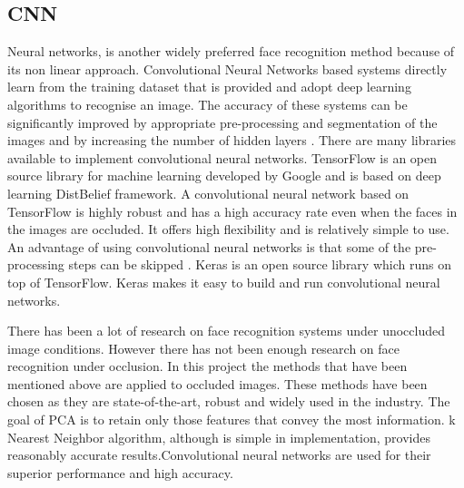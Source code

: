 \documentclass[conference]{IEEEtran}
\begin{document}
\subsection{CNN}
\label{subsec: 1d.CNN}
Neural networks, is another widely preferred face recognition method because of its non linear approach. Convolutional Neural Networks based systems directly learn from the training dataset that is provided and adopt deep learning algorithms to recognise an image. The accuracy of these systems can be significantly improved by appropriate pre-processing and segmentation of the images and by increasing the number of hidden layers \cite{dean2012large}.
There are many libraries available to implement convolutional neural networks\cite{2016arXiv160502688short}\cite{Jia:2014:CCA:2647868.2654889}\cite{tensorflow2015-whitepaper}. TensorFlow is an open source library for machine learning developed by Google and is based on deep learning DistBelief framework. A convolutional neural network based on TensorFlow is highly robust and has a high accuracy rate even when the faces in the images are occluded.  It offers high flexibility and is relatively simple to use\cite{tensorflow2015-whitepaper}. An advantage of using convolutional neural networks is that some of the pre-processing steps can be skipped \cite{oliveira2017irish}. Keras is an open source library which runs on top of TensorFlow. Keras makes it easy to build and run convolutional neural networks\cite{chollet2015keras}. 

There has been a lot of research on face recognition systems under unoccluded image conditions. However there has not been enough research on face recognition under occlusion. In this project the methods that have been mentioned above are applied to occluded images. These methods have been chosen as they are state-of-the-art, robust and widely used in the industry. The goal of PCA is to retain only those features that convey the most information\cite{turk1991face}. k Nearest Neighbor algorithm, although is simple in implementation, provides reasonably accurate results\cite{zhang2007ml}.Convolutional neural networks are used for their superior performance and high accuracy\cite{lawrence1997face}.
\end{document}
